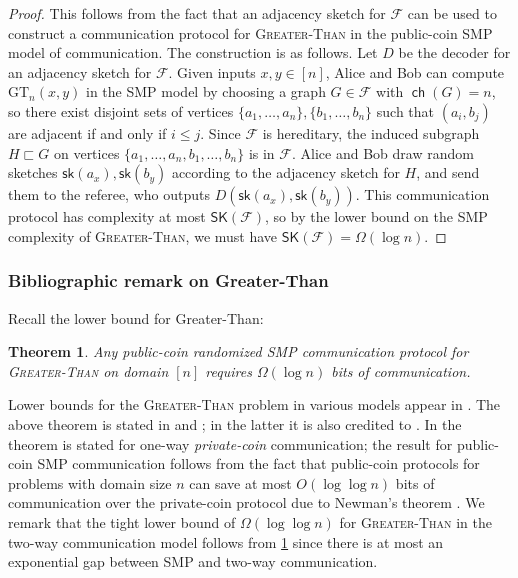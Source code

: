 \documentclass{article}
\newtheorem{theorem}{Theorem}\newtheorem{lemma}[theorem]{Lemma}\newtheorem{proposition}[theorem]{Proposition}\newtheorem{corollary}[theorem]{Corollary}\newtheorem{definition}[theorem]{Definition}\newtheorem{claim}[theorem]{Claim}\newtheorem{remark}[theorem]{Remark}\newtheorem{observation}[theorem]{Observation}\newtheorem{conjecture}[theorem]{Conjecture}\newtheorem{example}[theorem]{Example}
\newcommand{\cF}{\ensuremath{\mathcal{F}}}
\newcommand{\sk}{\mathsf{sk}}
\newcommand{\RL}{\mathsf{SK}}
\DeclareMathOperator\ch{\mathsf{ch}}
\begin{document}
\lowerbound*
\begin{proof}
This follows from the fact that an adjacency sketch for $\cF$ can be used to construct a
communication protocol for \textsc{Greater-Than} in the public-coin SMP model of communication.  The construction is as follows. Let $D$ be the decoder for
an adjacency sketch for $\cF$. Given inputs $x,y \in [n]$, Alice and Bob can compute
$\mathrm{GT}_n(x,y)$ in the SMP model by choosing a graph $G \in \cF$ with $\ch(G)=n$, so there
exist disjoint sets of vertices $\{a_1, \dotsc, a_n\}, \{b_1, \dotsc, b_n\}$ such that $(a_i,b_j)$
are adjacent if and only if $i \leq j$.  Since $\cF$ is hereditary, the induced subgraph $H
\sqsubset G$ on vertices $\{a_1, \dotsc, a_n, b_1, \dotsc, b_n\}$ is in $\cF$. Alice and Bob draw
random sketches $\sk(a_x),\sk(b_y)$ according to the adjacency sketch for $H$, and send them to the
referee, who outputs $D(\sk(a_x),\sk(b_y))$. This communication protocol has complexity at most
$\RL(\cF)$, so by the lower bound on the SMP complexity of \textsc{Greater-Than}, we must have
$\RL(\cF) = \Omega(\log n)$.
\end{proof}

\subsubsection{Bibliographic remark on Greater-Than}
\label{app:lower-bound-greater-than}

Recall the lower bound for Greater-Than:
\begin{theorem}
\label{thm:greater-than-lower-bound}
Any public-coin randomized SMP communication protocol for \textsc{Greater-Than} on domain $[n]$
requires $\Omega(\log n)$ bits of communication.
\end{theorem}

Lower bounds for the \textsc{Greater-Than} problem in various models appear in \cite{KNR99, MNSW98,
Viol15, RS15, ATYY17}.  The above theorem is stated in \cite{KNR99} and \cite{MNSW98}; in the latter
it is also credited to \cite{Smir88}. In \cite{KNR99} the theorem is stated for one-way
\emph{private-coin} communication; the result for public-coin SMP communication follows from the
fact that public-coin protocols for problems with domain size $n$ can save at most $O(\log \log n)$
bits of communication over the private-coin protocol due to Newman's theorem \cite{New91}.
We remark that the tight lower bound of $\Omega(\log\log n)$ for \textsc{Greater-Than} in the two-way
communication model follows from \cref{thm:greater-than-lower-bound} since there is at most an
exponential gap between SMP and two-way communication.
\end{document}
